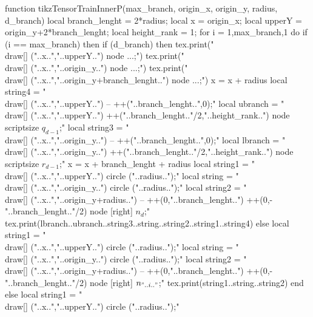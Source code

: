 \begin{luacode*}
      function tikzTensorTrainInnerP(max_branch, origin_x, origin_y, radius, d_branch)
      local branch_lenght = 2*radius;
      local x = origin_x;
      local upperY = origin_y+2*branch_lenght;
      local height_rank = 1;
      for i = 1,max_branch,1 do
        if (i == max_branch) then
          if (d_branch) then
            tex.print("\\draw[] ("..x..","..upperY..") node {...};")
            tex.print("\\draw[] ("..x..","..origin_y..") node {...};")
            tex.print("\\draw[] ("..x..","..origin_y+branch_lenght..") node {...};")
            x = x + radius
            local string4 = "\\draw[] ("..x..","..upperY..") -- ++("..branch_lenght..",0);"
            local ubranch = "\\draw[] ("..x..","..upperY..") ++("..branch_lenght.."/2,"..height_rank..") node {\\scriptsize $q_{d-1}$};"
            local string3 = "\\draw[] ("..x..","..origin_y..") -- ++("..branch_lenght..",0);"
            local lbranch = "\\draw[] ("..x..","..origin_y..") ++("..branch_lenght.."/2,"..height_rank..") node {\\scriptsize $r_{d-1}$};"
            x = x + branch_lenght + radius
            local string1 = "\\draw[] ("..x..","..upperY..") circle ("..radius..");"
            local string = "\\draw[] ("..x..","..origin_y..") circle ("..radius..");"
            local string2 = "\\draw[] ("..x..","..origin_y+radius..") -- ++(0,"..branch_lenght..") ++(0,-"..branch_lenght.."/2) node [right] {$n_{d}$};"
            tex.print(lbranch..ubranch..string3..string..string2..string1..string4)
          else
            local string1 = "\\draw[] ("..x..","..upperY..") circle ("..radius..");"
            local string = "\\draw[] ("..x..","..origin_y..") circle ("..radius..");"
            local string2 = "\\draw[] ("..x..","..origin_y+radius..") -- ++(0,"..branch_lenght..") ++(0,-"..branch_lenght.."/2) node [right] {$n_{"..i.."}$};"
            tex.print(string1..string..string2)
          end
        else
          local string1 = "\\draw[] ("..x..","..upperY..") circle ("..radius..");"

\end{luacode*}
